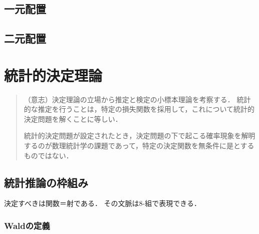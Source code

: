 \documentclass[uplatex,dvipdfmx]{jsreport}
\begin{document}
\section{一元配置}

\begin{tcolorbox}[colframe=ForestGreen, colback=ForestGreen!10!white,breakable,colbacktitle=ForestGreen!40!white,coltitle=black,fonttitle=\bfseries\sffamily,
title=one-way ANOVA]
    
\end{tcolorbox}

\section{二元配置}

\chapter{統計的決定理論}

\begin{quotation}
    （意志）決定理論の立場から推定と検定の小標本理論を考察する．
    統計的な推定を行うことは，特定の損失関数を採用して，これについて統計的決定問題を解くことに等しい．

    統計的決定問題が設定されたとき，決定問題の下で起こる確率現象を解明するのが数理統計学の課題であって，特定の決定関数を無条件に是とするものではない．
\end{quotation}

\section{統計推論の枠組み}

\begin{tcolorbox}[colframe=ForestGreen, colback=ForestGreen!10!white,breakable,colbacktitle=ForestGreen!40!white,coltitle=black,fonttitle=\bfseries\sffamily,
title=]
    決定すべきは関数＝射である．
    その文脈は8-組で表現できる．
\end{tcolorbox}

\subsection{Waldの定義}
\end{document}
